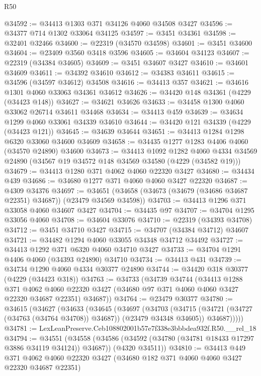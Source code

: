 \begin{lexlean}{R50}
\begin{coremodule}
@34592 := @34413 @1303 @371 @34126 @4060 @34508 @3427
@34596 := @34377 @714 @1302 @33064 @34125
@34597 := @3451 @34361
@34598 := @32401 @32466
@34600 := @22319 (@34570 @34598)
@34601 := @3451 @34600
@34604 := @23409 @3560 @3418 @3596
@34605 := @34604 @34123
@34607 := @22319 (@34384 @34605)
@34609 := @3451 @34607 @3427
@34610 := @34601 @34609
@34611 := @34392 @34610
@34612 := @34383 @34611
@34615 := @34596 (@34597 @34612) @34508
@34616 := @34413 @357
@34621 := @34616 @1301 @4060 @33063 @34361 @34612
@34626 := @34420 @148 @34361 (@4229 (@34423 @148))
@34627 := @34621 @34626
@34633 := @34458 @1300 @4060 @33062 @26714 @34611 @34468
@34634 := @34413 @459
@34639 := @34634 @1299 @4060 @33061 @34339 @34610
@34644 := @34420 @121 @34339 (@4229 (@34423 @121))
@34645 := @34639 @34644
@34651 := @34413 @1284 @1298 @6320 @33060 @34600 @34609
@34658 := @34435 @1277 @1283 @4406 @4060 (@34570 @24890) @34600
@34673 := @34413
    @1092
    @1282
    @4060
    @4334
    @34569
    @24890
    (@34567 @19 @34572 @148 @34569 @34580 (@4229 (@34582 @19)))
@34679 := @34413 @1280 @371 @4062 @4060 @22320 @3427
@34680 := @34434 @439
@34686 := @34680 @1277 @371 @4060 @4060 @3427 @22320
@34687 := @4309 @34376
@34697 := @34651 (@34658 (@34673 (@34679 (@34686 @34687 @22351) @34687)) (@23479 @34569 @34598))
@34703 := @34413 @1296 @371 @33058 @4060 @34607 @3427
@34704 := @34435 @97
@34707 := @34704 @1295 @33056 @4060
@34708 := @34604 @33076
@34710 := @22319 (@34393 @34708)
@34712 := @3451 @34710 @3427
@34715 := @34707 (@34384 @34712) @34607
@34721 := @34482 @1294 @4060 @33055 @34348 @34712 @34492
@34727 := @34413 @1292 @371 @6320 @4060 @34710 @3427
@34733 := @34704 @1291 @4406 @4060 (@34393 @24890) @34710
@34734 := @34413 @431
@34739 := @34734 @1290 @4060 @4334 @30377 @24890
@34744 := @34420 @318 @30377 (@4229 (@34423 @318))
@34763 := @34733
    (@34739
      @34744
      (@34413
        @1288
        @371
        @4062
        @4060
        @22320
        @3427
        (@34680 @97 @371 @4060 @4060 @3427 @22320 @34687 @22351)
        @34687))
@34764 := @23479 @30377
@34780 := @34615
    (@34627
      (@34633
        (@34645
          (@34697
            (@34703
              (@34715 (@34721 (@34727 (@34763 (@34764 @34708)) @34687)) (@23479 @34348 @34605))
              @34687)))))
@34781 := LexLeanPreserve.Ceb108802001b57e7f338e3bbbdea932f.R50.__rel_18
@34794 := @34551
    (@34558
      (@34586 (@34592 (@34780 (@34781 @18433 @17297 @3886 @34119 @34124)) @34687))
      (@4320 @34511))
@34810 := @34413
    @449
    @371
    @4062
    @4060
    @22320
    @3427
    (@34680 @182 @371 @4060 @4060 @3427 @22320 @34687 @22351)

\end{coremodule}
\end{lexlean}
